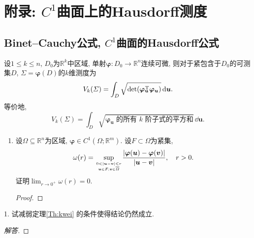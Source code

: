\section{附录: \(C^1\)曲面上的Hausdorff测度}
\subsection{Binet--Cauchy公式, \(C^1\)曲面的Hausdorff公式}
\begin{theorem}\label{Th:kwei}
设\(1\leqslant k\leqslant n\), \(D_0\)为\(\mathbb{R}^k\)中区域, 
单射\(\boldsymbol{\varphi}:D_0\rightarrow\mathbb{R}^n\)连续可微, 
则对于紧包含于\(D_0\)的可测集\(D\), \(\varSigma=\boldsymbol{\varphi}(D)\)的\(k\)维测度为
\[V_k(\varSigma)=\int_D\sqrt{\det(\boldsymbol{\varphi_u}^{\!\!\!\!\rm T}\boldsymbol{\varphi_u})}\,\mathrm{d}\boldsymbol{u}.\]
等价地,\[V_k(\varSigma)=\int_D\sqrt{\boldsymbol{\varphi_u}\text{ 的所有 }k\text{ 阶子式的平方和}}\,\dd\boldsymbol{u}.\]
\end{theorem}

\begin{quiza}
\begin{enumerate}
\item 设\(\varOmega\subseteq\mathbb{R}^n\)为区域, 
\(\boldsymbol{\varphi}\in C^1(\varOmega;\mathbb{R}^m)\). 
设\(F\subset \varOmega\)为紧集,
\[\omega(r)=\underset{0<|\boldsymbol{u}-\boldsymbol{v}|\leqslant r
\atop\boldsymbol{u}\in F,\boldsymbol{v}\in\overline{\varOmega}}{\sup}
\frac{\left|\boldsymbol{\varphi}(\boldsymbol{u})-\boldsymbol{\varphi}(\boldsymbol{v})\right|}
{|\boldsymbol{u}-\boldsymbol{v}|},\quad r>0.\]
证明\(\lim_{r\rightarrow 0^+}\omega(r)=0.\)
\begin{proof}

\end{proof}
\end{enumerate}
\end{quiza}
\begin{quizb}
1. 试减弱定理\ref{Th:kwei} 的条件使得结论仍然成立.
\begin{proof}[解答]

\end{proof}
\end{quizb}